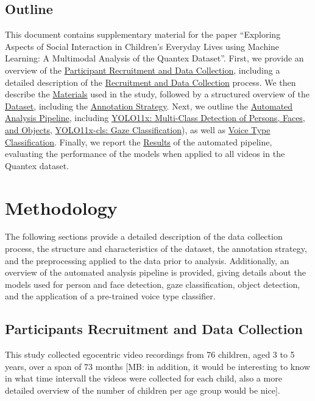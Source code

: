 \documentclass[
  man,floatsintext]{apa6}
\begin{document}
\subsection{Outline}\label{outline}

This document contains supplementary material for the paper ``Exploring Aspects of Social Interaction in Children's Everyday Lives using Machine Learning: A Multimodal Analysis of the Quantex Dataset''. First, we provide an overview of the \hyperref[sup-participants]{Participant Recruitment and Data Collection}, including a detailed description of the \hyperref[sup-recruitment]{Recruitment and Data Collection} process. We then describe the \hyperref[sup-materials]{Materials} used in the study, followed by a structured overview of the \hyperref[sup-dataset]{Dataset}, including the \hyperref[sup-annotation-strategy]{Annotation Strategy}. Next, we outline the \hyperref[sup-automatic-analysis]{Automated Analysis Pipeline}, including \hyperref[sup-yolo11x]{YOLO11x: Multi-Class Detection of Persons, Faces, and Objects}, \hyperref[sup-yolo11x-cls]{YOLO11x-cls: Gaze Classification}), as well as \hyperref[sup-voice-type]{Voice Type Classification}. Finally, we report the \hyperref[sup-results]{Results} of the automated pipeline, evaluating the performance of the models when applied to all videos in the Quantex dataset.

\section{Methodology}\label{sup-methodology}

The following sections provide a detailed description of the data collection process, the structure and characteristics of the dataset, the annotation strategy, and the preprocessing applied to the data prior to analysis. Additionally, an overview of the automated analysis pipeline is provided, giving details about the models used for person and face detection, gaze classification, object detection, and the application of a pre-trained voice type classifier.

\subsection{Participants Recruitment and Data Collection}\label{sup-participants}

This study collected egocentric video recordings from 76 children, aged 3 to 5 years, over a span of 73 months {[}MB: in addition, it would be interesting to know in what time intervall the videos were collected for each child, also a more detailed overview of the number of children per age group would be nice{]}.
\end{document}
